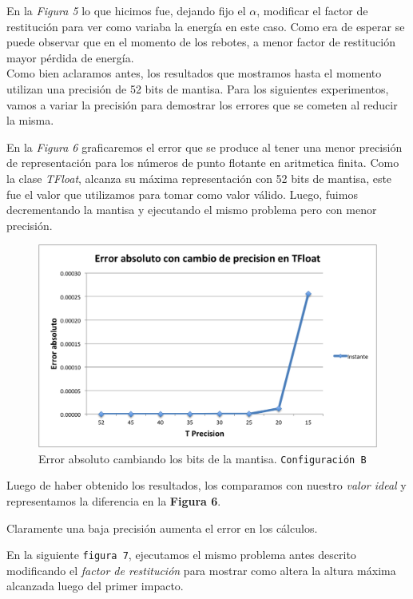 \documentclass[a4paper]{article}
\begin{document}
En la \textit{Figura 5} lo que hicimos fue, dejando fijo el $\alpha$, modificar el factor de restitución para ver como variaba la energía en este caso. Como era de esperar se puede observar que en el momento de los rebotes, a menor factor de restitución mayor pérdida de energía.\\[1em]


Como bien aclaramos antes, los resultados que mostramos hasta el momento utilizan una precisión de 52 bits de mantisa. Para los siguientes experimentos, vamos a variar la precisión para demostrar los errores que se cometen al reducir la misma.



En la \textit{Figura 6} graficaremos el error que se produce al tener una menor precisión de representación para los números de punto flotante en aritmetica finita. 
Como la clase \textit{TFloat}, alcanza su máxima representación con 52 bits de mantisa, este fue el valor que utilizamos para tomar como valor válido. Luego, fuimos decrementando la mantisa y ejecutando el mismo problema pero con menor precisión. \\[1em]

\begin{figure}[H]
  \centering
  \includegraphics[scale=0.75]{graficos/6-errorAbsoluto.png}
  \caption{Error absoluto cambiando los bits de la mantisa. \texttt{Configuración B} }
\end{figure}

Luego de haber obtenido los resultados, los comparamos con nuestro \textit{valor ideal} y representamos la diferencia en la \textbf{Figura 6}.

Claramente una baja precisión aumenta el error en los cálculos.


En la siguiente \texttt{figura 7}, ejecutamos el mismo problema antes descrito modificando el \textit{factor de restitución} para mostrar como altera la altura máxima alcanzada luego del primer impacto.
\end{document}
